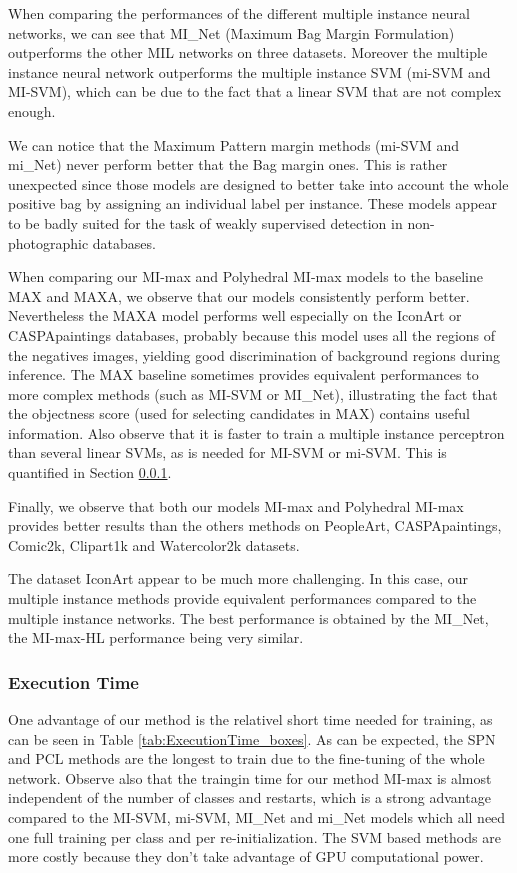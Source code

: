 \documentclass[preprint]{elsarticle}
\newcommand\NB{IconArt} \newcommand\MIL{MI-max without score}
\newcommand\MILS{MI-max}
\newcommand\MAX{MAX}
\newcommand\MAXA{MAXA}
\newcommand\mimaxaddlayerS{MI-max-HL}
\newcommand\MaxOfMaxS{Polyhedral MI-max}
\begin{document}
When comparing the performances of the different multiple instance neural networks, we can see that MI\_Net (Maximum Bag Margin Formulation) outperforms the other MIL networks on three datasets. Moreover the multiple instance neural network outperforms the multiple instance SVM (mi-SVM and MI-SVM), which can be due to the fact that a linear SVM that are not complex enough. 

We can notice that the Maximum Pattern margin methods (mi-SVM and mi\_Net) never perform better that the Bag margin ones. This is rather unexpected since those models are designed to better take into account the whole positive bag by assigning an individual label per instance. These models appear to be badly suited for the task of weakly supervised detection in non-photographic databases.

When comparing our \MILS{} and \MaxOfMaxS{} models to the baseline \MAX{} and \MAXA{}, we observe that our models consistently perform better. Nevertheless the \MAXA{} model performs well especially on the \NB{} or CASPApaintings databases, probably because this model uses all the regions of the negatives images, yielding good discrimination of background regions during inference. The \MAX{} baseline sometimes provides equivalent performances to more complex methods (such as MI-SVM or MI\_Net), illustrating the fact that the objectness score (used for selecting candidates in \MAX{}) contains useful information.
Also observe that it is faster to train a multiple instance perceptron than several linear SVMs, as is needed for MI-SVM or mi-SVM. This is quantified in Section \ref{sec:execution_time}.


Finally, we observe that both our models \MILS{} and \MaxOfMaxS{} provides better results than the others methods on PeopleArt, CASPApaintings, Comic2k, Clipart1k and Watercolor2k datasets.

The dataset \NB{} appear to be much more challenging. In this case, our multiple instance methods provide equivalent performances compared to the multiple instance networks. The best performance is obtained by the MI\_Net, the \mimaxaddlayerS{} performance being very similar. 

\subsubsection{Execution Time}
\label{sec:execution_time}


One advantage of our method is the relativel short time needed for training, as can be seen in Table \ref{tab:ExecutionTime_boxes}.
As can be expected, the SPN and PCL methods are the longest to train due to the fine-tuning of the whole network.
Observe also that the traingin time for our method \MILS{} is almost independent of the number of classes and restarts, which is a strong advantage compared to the MI-SVM, mi-SVM, MI\_Net and mi\_Net models which all need one full training per class and per re-initialization. The SVM based methods are more costly because they don't take advantage of GPU computational power.
\end{document}
